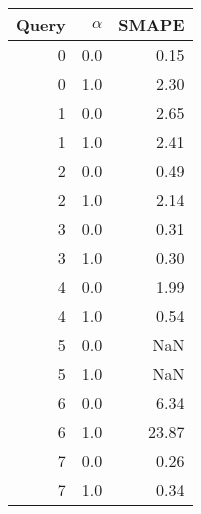 \begin{tabular}{rrr}
\toprule
 Query &  $\alpha$ &  SMAPE \\
\midrule
     0 &     0.0 &   0.15 \\
     0 &     1.0 &   2.30 \\
     1 &     0.0 &   2.65 \\
     1 &     1.0 &   2.41 \\
     2 &     0.0 &   0.49 \\
     2 &     1.0 &   2.14 \\
     3 &     0.0 &   0.31 \\
     3 &     1.0 &   0.30 \\
     4 &     0.0 &   1.99 \\
     4 &     1.0 &   0.54 \\
     5 &     0.0 &    NaN \\
     5 &     1.0 &    NaN \\
     6 &     0.0 &   6.34 \\
     6 &     1.0 &  23.87 \\
     7 &     0.0 &   0.26 \\
     7 &     1.0 &   0.34 \\
\bottomrule
\end{tabular}
